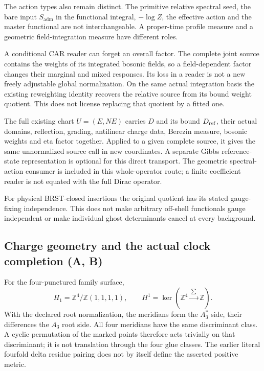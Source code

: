The action types also remain distinct. The primitive relative spectral
seed, the bare input $S_{\mathrm{adm}}$ in the functional integral,
$-\log Z$, the effective action and the master functional are not
interchangeable. A proper-time profile measure and a geometric
field-integration measure have different roles.

A conditional CAR reader can forget an overall factor. The complete
joint source contains the weights of its integrated bosonic fields, so
a field-dependent factor changes their marginal and mixed responses.
Its loss in a reader is not a new freely adjustable global normalization.
On the same actual integration basis the existing reweighting identity
recovers the relative source from its bound weight quotient. This does
not license replacing that quotient by a fitted one.

The full existing chart $U=(E,NE)$ carries $D$ and its bound $D_{\rm ref}$,
their actual domains, reflection, grading, antilinear charge data,
Berezin measure, bosonic weights and eta factor together. Applied to a
given complete source, it gives the same unnormalized source call in
new coordinates. A separate Gibbs reference-state representation is
optional for this direct transport. The geometric spectral-action
consumer is included in this whole-operator route; a finite coefficient
reader is not equated with the full Dirac operator.

For physical BRST-closed insertions the original quotient has its stated
gauge-fixing independence. This does not make arbitrary off-shell
functionals gauge independent or make individual ghost determinants
cancel at every background.

\subsection*{Charge geometry and the actual clock completion (A, B)}

For the four-punctured family surface,
\[
 H_1=\mathbb Z^4/\mathbb Z(1,1,1,1),\qquad
 H^1=\ker\!\left(\mathbb Z^4\xrightarrow{\ \sum\ }\mathbb Z\right).
\]
With the declared root normalization, the meridians form the $A_3^*$
side, their differences the $A_3$ root side. All four meridians have
the same discriminant class. A cyclic permutation of the marked points
therefore acts trivially on that discriminant; it is not translation
through the four glue classes. The earlier literal fourfold delta
residue pairing does not by itself define the asserted positive metric.

